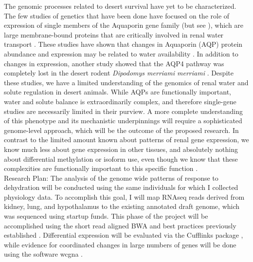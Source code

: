 \documentclass[11pt]{article}
\begin{document}
The genomic processes related to desert survival have yet to be characterized. The few studies of genetics that have been done have focused on the role of expression of single members of the Aquaporin gene family (but see \cite{Bartolo:2007hy}), which are large membrane-bound proteins that are critically involved in renal water transport \citep{Kwon:2009bv,Verkman:2002ww,Brown:1995vo,Nielsen:1995cb}. These studies have shown that changes in Aquaporin (AQP) protein abundance and expression may be related to water availability \citep{Boselt:2009fb, Gallardo:2005fm,Bozinovic:2003eg}. In addition to changes in expression, another study showed that the AQP4 pathway was completely lost in the desert rodent \textit{Dipodomys merriami merriami} \citep{Huang:2001ti}. Despite these studies, we have a limited understanding of the genomics of renal water and solute regulation in desert animals. While AQPs are functionally important, water and solute balance is extraordinarily complex, and therefore single-gene studies are necessarily limited in their purview. A more complete understanding of this phenotype and its mechanistic underpinnings will require a sophisticated genome-level approach, which will be the outcome of the proposed research. In contrast to the limited amount known about patterns of renal gene expression, we know much less about gene expression in other tissues, and absolutely nothing about differential methylation or isoform use, even though we know that these complexities are functionally important to this specific function \citep{Yukutake:2010ia,Silberstein:2004ex}. \\

Research Plan: The analysis of the genome wide patterns of response to dehydration will be conducted using the same individuals for which I collected physiology data. To accomplish this goal, I will map RNAseq reads derived from kidney, lung, and hypothalamus to the existing annotated draft genome, which was sequenced using startup funds. This phase of the project will be accomplished using the short read aligned BWA \citep{Li:2013wn} and best practices previously established \citep{MacManes:2014io}. Differential expression will be evaluated via the Cufflinks package \citep{Trapnell:2012kp}, while evidence for coordinated changes in large numbers of genes will be done using the software wcgna \citep{Langfelder:2008bd}. \\
\end{document}
